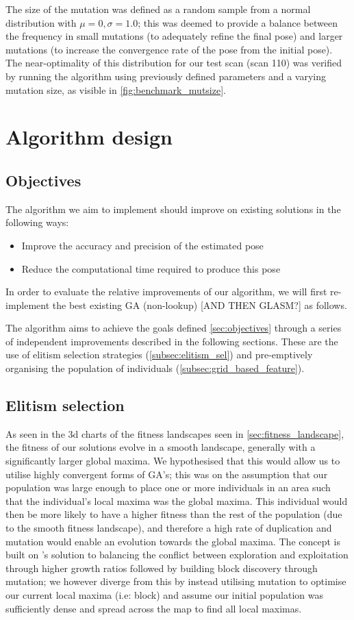 \documentclass[authoryearcitations]{UoYCSproject}
\begin{document}
The size of the mutation was defined as a random sample from a normal distribution with $\mu=0, \sigma=1.0$; this was deemed to provide a balance between the frequency in small mutations (to adequately refine the final pose) and larger mutations (to increase the convergence rate of the pose from the initial pose). The near-optimality of this distribution for our test scan (scan 110) was verified by running the algorithm using previously defined parameters and a varying mutation size, as visible in \autoref{fig:benchmark_mutsize}.


\chapter{Algorithm design}
\section{Objectives}
\label{sec:objectives}
The algorithm we aim to implement should improve on existing solutions in the following ways:
\begin{itemize}
	\item Improve the accuracy and precision of the estimated pose
	\item Reduce the computational time required to produce this pose
\end{itemize}
In order to evaluate the relative improvements of our algorithm, we will first re-implement the best existing GA (non-lookup) [AND THEN GLASM?] as follows.

The algorithm aims to achieve the goals defined \autoref{sec:objectives} through a series of independent improvements described in the following sections. These are the use of elitism selection strategies (\autoref{subsec:elitism_sel}) and pre-emptively organising the population of individuals (\autoref{subsec:grid_based_feature}).


\section{Elitism selection}
\label{subsec:elitism_sel}
As seen in the 3d charts of the fitness landscapes seen in \autoref{sec:fitness_landscape}, the fitness of our solutions evolve in a smooth landscape, generally with a significantly larger global maxima. We hypothesised that this would allow us to utilise highly convergent forms of GA's; this was on the assumption that our population was large enough to place one or more individuals in an area such that the individual's local maxima was the global maxima. This individual would then be more likely to have a higher fitness than the rest of the population (due to the smooth fitness landscape), and therefore a high rate of duplication and mutation would enable an evolution towards the global maxima. The concept is built on \citet{David_E_Goldberg1991-es}'s solution to balancing the conflict between exploration and exploitation through higher growth ratios followed by building block discovery through mutation; we however diverge from this by instead utilising mutation to optimise our current local maxima (i.e: block) and assume our initial population was sufficiently dense and spread across the map to find all local maximas.
	
\end{document}
